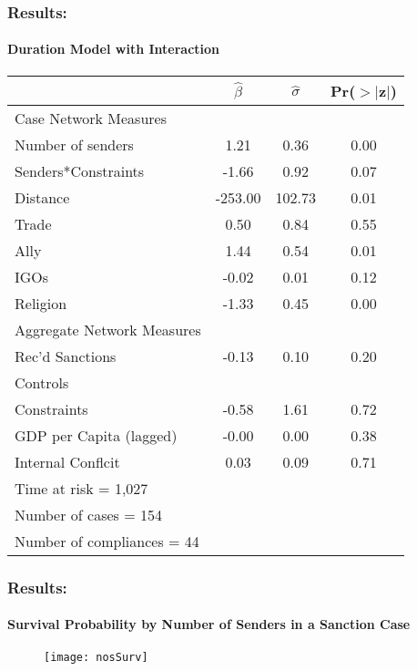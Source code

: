 \begin{frame}
\frametitle{Results:}
\framesubtitle{Duration Model with Interaction}

\footnotesize{
	\begin{table}[ht]
		\begin{center}
			\begin{tabular}{lccc}
			\hline\hline
			&$\hat{\beta}$&$\hat{\sigma}$& Pr($>$$|$z$|$) \\
			\hline
			Case Network Measures \\		
			\;\;\; Number of senders & 1.21 & 0.36 & 0.00 \\ 
			\;\;\; Senders*Constraints & -1.66 & 0.92 & 0.07 \\ 		
			\;\;\; Distance & -253.00 & 102.73 & 0.01 \\ 		
			\;\;\; Trade & 0.50 & 0.84 & 0.55 \\ 
			\;\;\; Ally & 1.44 & 0.54 & 0.01 \\ 
			\;\;\; IGOs & -0.02 & 0.01 & 0.12 \\		
			\;\;\; Religion & -1.33 & 0.45 & 0.00 \\ 
			Aggregate Network Measures \\		
			\;\;\; Rec'd Sanctions & -0.13 & 0.10 & 0.20 \\ 
			Controls \\		
			\;\;\; Constraints & -0.58 & 1.61 & 0.72 \\ 
			\;\;\; GDP per Capita (lagged) & -0.00 & 0.00 & 0.38 \\ 
			\;\;\; Internal Conflcit & 0.03 & 0.09 & 0.71 \\ 
			\hline
			Time at risk = 1,027 &&&\\
			Number of cases = 154 &&&\\
			Number of compliances = 44 &&&\\
			\hline\hline
		\end{tabular}
		\end{center}
	\end{table}
}
\end{frame}

\begin{frame}
\frametitle{Results:}
\framesubtitle{Survival Probability by Number of Senders in a Sanction Case}

\vspace{0.7cm}
\begin{figure}[ht]
	\centering
	\texttt{[image: nosSurv]}
\end{figure}

\end{frame}

